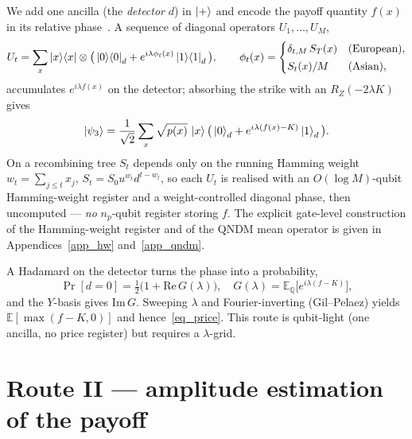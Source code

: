 \documentclass[11pt]{article}
\newcommand{\E}{\mathbb{E}}
\newcommand{\Q}{\mathbb{Q}}
\begin{document}
We add one ancilla (the \emph{detector} $d$) in $\ket{+}$ and encode the payoff quantity $f(x)$ in its relative phase~\cite{espa_2023}. A sequence of diagonal operators $U_1,\dots,U_M$,
\begin{equation}\label{eq_Ut}
U_t=\sum_{x}\ket{x}\!\bra{x}\otimes\big(\ket{0}\!\bra{0}_d+e^{i\lambda\phi_t(x)}\ket{1}\!\bra{1}_d\big),
\qquad
\phi_t(x)=\begin{cases}\delta_{t,M}\,S_T(x) & \text{(European)},\\[2pt] S_t(x)/M & \text{(Asian)},\end{cases}
\end{equation}
accumulates $e^{i\lambda f(x)}$ on the detector; absorbing the strike with an $R_Z(-2\lambda K)$ gives
\begin{equation}\label{eq_psi3}
\ket{\psi_3}=\frac{1}{\sqrt2}\sum_x\sqrt{p(x)}\,\ket{x}\big(\ket{0}_d+e^{i\lambda(f(x)-K)}\ket{1}_d\big).
\end{equation}
On a recombining tree $S_t$ depends only on the running Hamming weight $w_t=\sum_{j\le t}x_j$, $S_t=S_0u^{w_t}d^{t-w_t}$, so each $U_t$ is realised with an $O(\log M)$-qubit Hamming-weight register and a weight-controlled diagonal phase, then uncomputed --- \emph{no} $n_p$-qubit register storing $f$. The explicit gate-level construction of the Hamming-weight register and of the QNDM mean operator is given in Appendices~\ref{app_hw} and~\ref{app_qndm}.

A Hadamard on the detector turns the phase into a probability,
\begin{equation}\label{eq_charfn}
\Pr[d=0]=\tfrac12\big(1+\mathrm{Re}\,G(\lambda)\big),\quad G(\lambda)=\E_\Q\!\big[e^{i\lambda(f-K)}\big],
\end{equation}
and the $Y$-basis gives $\mathrm{Im}\,G$. Sweeping $\lambda$ and Fourier-inverting (Gil--Pelaez) yields $\E[\max(f-K,0)]$ and hence~\eqref{eq_price}. This route is qubit-light (one ancilla, no price register) but requires a $\lambda$-grid.

\section{Route II --- amplitude estimation of the payoff}\label{sec_qae}
\end{document}
